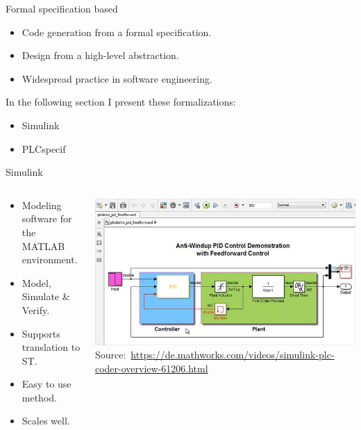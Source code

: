 \documentclass[18pt]{beamer}
\begin{document}
\begin{frame}{Formal specification based}
\begin{itemize}
    \item Code generation from a formal specification.
    \item Design from a high-level abstraction.
    \item Widespread practice in software engineering.
\end{itemize}
In the following section I present these formalizations:
\begin{itemize}
    \item Simulink
    \item PLCspecif
\end{itemize}
\end{frame}

\begin{frame}{Simulink}
\begin{columns}
    \begin{column}{0.5\textwidth}
        \begin{itemize}
            \item Modeling software for the MATLAB environment.
            \item Model, Simulate \& Verify.
            \item Supports translation to ST.
            \item Easy to use method.
            \item Scales well.
        \end{itemize}
    \end{column}
    \begin{column}{0.5\textwidth}
        \includegraphics[width=\textwidth]{./figures/simulink.jpg}
       {\footnotesize  Source:~\url{https://de.mathworks.com/videos/simulink-plc-coder-overview-61206.html}}
    \end{column}
\end{columns}
\end{frame}
\end{document}
